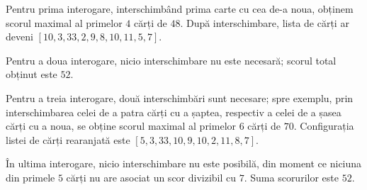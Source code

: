 \documentclass[ro]{problem}
\begin{document}
Pentru prima interogare, interschimbând prima carte cu cea de-a noua, obținem scorul maximal al primelor $4$ cărți de $48$. După interschimbare, lista de cărți ar deveni $[10, 3, 33, 2, 9, 8, 10, 11, 5, 7]$.

Pentru a doua interogare, nicio interschimbare nu este necesară; scorul total obținut este $52$.

Pentru a treia interogare, două interschimbări sunt necesare; spre exemplu, prin interschimbarea celei de a patra cărți cu a șaptea, respectiv a celei de a șasea cărți cu a noua, se obține scorul maximal al primelor $6$ cărți de $70$. Configurația listei de cărți rearanjată este $[5, 3, 33, 10, 9, 10, 2, 11, 8, 7]$.

În ultima interogare, nicio interschimbare nu este posibilă, din moment ce niciuna din primele $5$ cărți nu are asociat un scor divizibil cu $7$. Suma scorurilor este $52$.
\end{document}
